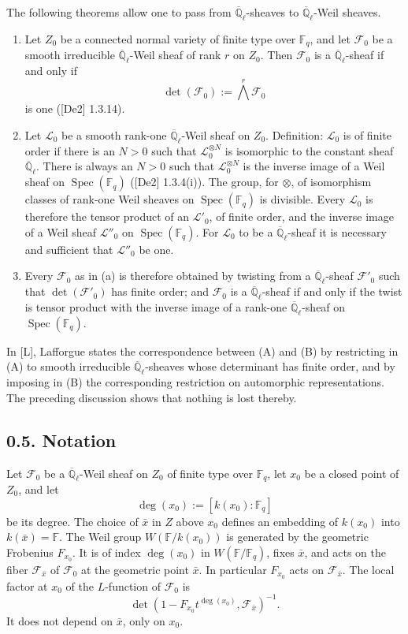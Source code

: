 \documentclass[11pt]{article}
\newcommand{\F}{\mathbb{F}}
\newcommand{\Ql}{\overline{\mathbb Q}_{\ell}}
\newcommand{\Spec}{\operatorname{Spec}}
\begin{document}
The following theorems allow one to pass from $\Ql$-sheaves to $\Ql$-Weil sheaves.
\begin{enumerate}[label=(\alph*)]
\item Let $Z_0$ be a connected normal variety of finite type over $\F_q$, and let $\mathcal F_0$ be a smooth irreducible $\Ql$-Weil sheaf of rank $r$ on $Z_0$. Then $\mathcal F_0$ is a $\Ql$-sheaf if and only if
\[
 \det(\mathcal F_0):=\bigwedge^r\mathcal F_0
\]
is one ([De2] 1.3.14).
\item Let $\mathcal L_0$ be a smooth rank-one $\Ql$-Weil sheaf on $Z_0$. Definition: $\mathcal L_0$ is of finite order if there is an $N>0$ such that $\mathcal L_0^{\otimes N}$ is isomorphic to the constant sheaf $\Ql$. There is always an $N>0$ such that $\mathcal L_0^{\otimes N}$ is the inverse image of a Weil sheaf on $\Spec(\F_q)$ ([De2] 1.3.4(i)). The group, for $\otimes$, of isomorphism classes of rank-one Weil sheaves on $\Spec(\F_q)$ is divisible. Every $\mathcal L_0$ is therefore the tensor product of an $\mathcal L'_0$, of finite order, and the inverse image of a Weil sheaf $\mathcal L''_0$ on $\Spec(\F_q)$. For $\mathcal L_0$ to be a $\Ql$-sheaf it is necessary and sufficient that $\mathcal L''_0$ be one.
\item Every $\mathcal F_0$ as in (a) is therefore obtained by twisting from a $\Ql$-sheaf $\mathcal F'_0$ such that $\det(\mathcal F'_0)$ has finite order; and $\mathcal F_0$ is a $\Ql$-sheaf if and only if the twist is tensor product with the inverse image of a rank-one $\Ql$-sheaf on $\Spec(\F_q)$.
\end{enumerate}
In [L], Lafforgue states the correspondence between (A) and (B) by restricting in (A) to smooth irreducible $\Ql$-sheaves whose determinant has finite order, and by imposing in (B) the corresponding restriction on automorphic representations.
The preceding discussion shows that nothing is lost thereby.

\subsection*{0.5. Notation}
Let $\mathcal F_0$ be a $\Ql$-Weil sheaf on $Z_0$ of finite type over $\F_q$, let $x_0$ be a closed point of $Z_0$, and let
\[
 \deg(x_0):=[k(x_0):\F_q]
\]
be its degree.
The choice of $\bar x$ in $Z$ above $x_0$ defines an embedding of $k(x_0)$ into $k(\bar x)=\F$.
The Weil group $W(\F/k(x_0))$ is generated by the geometric Frobenius $F_{x_0}$.
It is of index $\deg(x_0)$ in $W(\F/\F_q)$, fixes $\bar x$, and acts on the fiber $\mathcal F_{\bar x}$ of $\mathcal F_0$ at the geometric point $\bar x$.
In particular $F_{x_0}$ acts on $\mathcal F_{\bar x}$.
The local factor at $x_0$ of the $L$-function of $\mathcal F_0$ is
\begin{equation}
\det\left(1-F_{x_0}t^{\deg(x_0)},\mathcal F_{\bar x}\right)^{-1}.
\tag{0.5.1}
\end{equation}
It does not depend on $\bar x$, only on $x_0$.
\end{document}
